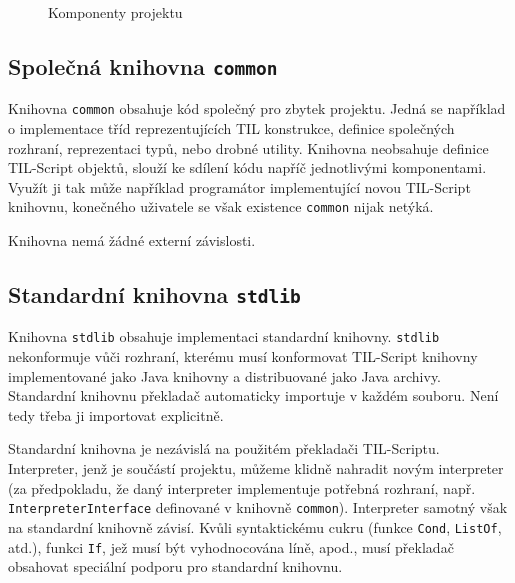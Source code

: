 \begin{figure}
    \centering
    \caption{Komponenty projektu}
    \label{fig:project-structure}
\end{figure}

\subsection{Společná knihovna \lstinline{common}}

Knihovna \lstinline{common} obsahuje kód společný pro zbytek projektu. Jedná
se například o implementace tříd reprezentujících TIL konstrukce, definice
společných rozhraní, reprezentaci typů, nebo drobné utility. Knihovna neobsahuje
definice TIL-Script objektů, slouží ke sdílení kódu napříč jednotlivými
komponentami. Využít ji tak může například programátor implementující novou
TIL-Script knihovnu, konečného uživatele se však existence \lstinline{common}
nijak netýká.

Knihovna nemá žádné externí závislosti.

\subsection{Standardní knihovna \lstinline{stdlib}}

Knihovna \lstinline{stdlib} obsahuje implementaci standardní knihovny.
\lstinline{stdlib} nekonformuje vůči rozhraní, kterému musí konformovat
TIL-Script knihovny implementované jako Java knihovny a distribuované jako Java
archivy. Standardní knihovnu překladač automaticky importuje v každém souboru.
Není tedy třeba ji importovat explicitně.

Standardní knihovna je nezávislá na použitém překladači TIL-Scriptu.
Interpreter, jenž je součástí projektu, můžeme klidně nahradit novým interpreter
(za předpokladu, že daný interpreter implementuje potřebná rozhraní, např.
\lstinline{InterpreterInterface} definované v knihovně \lstinline{common}).
Interpreter samotný však na standardní knihovně závisí. Kvůli syntaktickému
cukru (funkce \lstinline{Cond}, \lstinline{ListOf}, atd.), funkci
\lstinline{If}, jež musí být vyhodnocována líně, apod., musí překladač obsahovat
speciální podporu pro standardní knihovnu.


